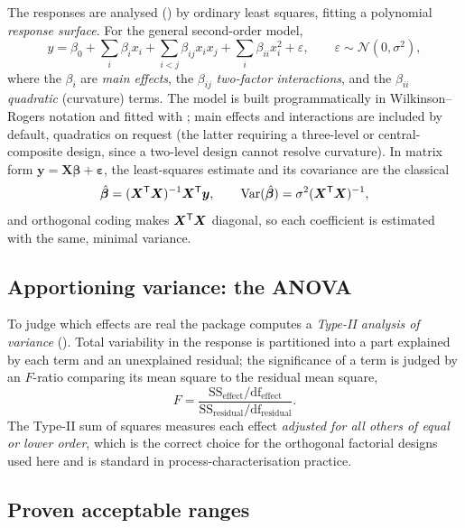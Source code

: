 The responses are analysed () by ordinary least squares,
fitting a polynomial \emph{response surface}. For the general second-order model,
%
\begin{equation}
y = \beta_0
  + \sum_{i} \beta_i x_i
  + \sum_{i<j} \beta_{ij} x_i x_j
  + \sum_i \beta_{ii} x_i^2
  + \varepsilon,
\qquad \varepsilon \sim \mathcal N(0,\sigma^2),
\label{eq:rsm}
\end{equation}
%
where the $\beta_i$ are \emph{main effects}, the $\beta_{ij}$ \emph{two-factor
interactions}, and the $\beta_{ii}$ \emph{quadratic} (curvature) terms. The model
is built programmatically in Wilkinson--Rogers notation and fitted with
; main effects and interactions are included by default,
quadratics on request (the latter requiring a three-level or central-composite
design, since a two-level design cannot resolve curvature). In matrix form
$\bm y = \bm X\bm\beta + \bm\varepsilon$, the least-squares estimate and its
covariance are the classical
%
\begin{equation}
\hat{\bm\beta} = (\bm X^{\mathsf{T}}\bm X)^{-1}\bm X^{\mathsf{T}} \bm y,
\qquad
\operatorname{Var}(\hat{\bm\beta}) = \sigma^2 (\bm X^{\mathsf{T}}\bm X)^{-1},
\label{eq:ols}
\end{equation}
%
and orthogonal coding makes $\bm X^{\mathsf{T}}\bm X$ diagonal, so each coefficient is
estimated with the same, minimal variance.

\subsection{Apportioning variance: the ANOVA}

To judge which effects are real the package computes a \emph{Type-II analysis of
variance} (). Total variability in the response is
partitioned into a part explained by each term and an unexplained residual; the
significance of a term is judged by an $F$-ratio comparing its mean square to the
residual mean square,
%
\begin{equation}
F = \frac{\mathrm{SS}_{\text{effect}}/\mathrm{df}_{\text{effect}}}
         {\mathrm{SS}_{\text{residual}}/\mathrm{df}_{\text{residual}}}.
\end{equation}
%
The Type-II sum of squares measures each effect \emph{adjusted for all others of
equal or lower order}, which is the correct choice for the orthogonal factorial
designs used here and is standard in process-characterisation practice.

\subsection{Proven acceptable ranges}

